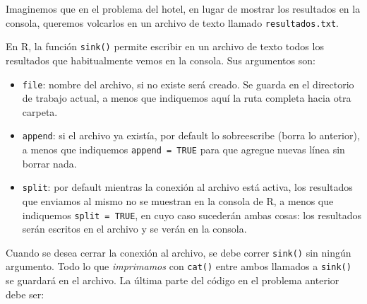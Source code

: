 \documentclass[
]{book}
\providecommand{\tightlist}{%
  \setlength{\itemsep}{0pt}\setlength{\parskip}{0pt}}
\begin{document}
Imaginemos que en el problema del hotel, en lugar de mostrar los resultados en la consola, queremos volcarlos en un archivo de texto llamado \texttt{resultados.txt}.

En R, la función \texttt{sink()} permite escribir en un archivo de texto todos los resultados que habitualmente vemos en la consola. Sus argumentos son:

\begin{itemize}
\tightlist
\item
  \texttt{file}: nombre del archivo, si no existe será creado. Se guarda en el directorio de trabajo actual, a menos que indiquemos aquí la ruta completa hacia otra carpeta.
\item
  \texttt{append}: si el archivo ya existía, por default lo sobreescribe (borra lo anterior), a menos que indiquemos \texttt{append\ =\ TRUE} para que agregue nuevas línea sin borrar nada.
\item
  \texttt{split}: por default mientras la conexión al archivo está activa, los resultados que enviamos al mismo no se muestran en la consola de R, a menos que indiquemos \texttt{split\ =\ TRUE}, en cuyo caso sucederán ambas cosas: los resultados serán escritos en el archivo y se verán en la consola.
\end{itemize}

Cuando se desea cerrar la conexión al archivo, se debe correr \texttt{sink()} sin ningún argumento. Todo lo que \emph{imprimamos} con \texttt{cat()} entre ambos llamados a \texttt{sink()} se guardará en el archivo. La última parte del código en el problema anterior debe ser:
\end{document}

